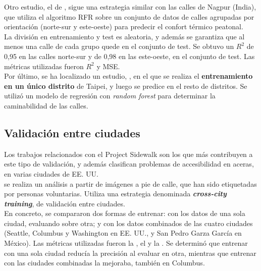 Otro estudio, el de \textcite{mohite2024}, sigue una estrategia similar con las calles de Nagpur (India), que utiliza el algoritmo \gls{RFR} sobre un conjunto de datos de calles agrupadas por orientación (norte-sur y este-oeste) para predecir el confort térmico peatonal.
\\

La división en entrenamiento y test es aleatoria, y además se garantiza que al menos una calle de cada grupo quede en el conjunto de test. Se obtuvo un $R^2$ de 0,95 en las calles norte-sur y de 0,98 en las este-oeste, en el conjunto de test. Las métricas utilizadas fueron $R^2$ y \gls{MSE}.
\\

Por último, se ha localizado un estudio, \textcite{li2024gsv}, en el que se realiza el \textbf{entrenamiento en un único distrito} de Taipei, y luego se predice en el resto de distritos. Se utilizó un modelo de regresión con \textit{random forest} para determinar la caminabilidad de las calles.
\\

\subsection{Validación entre ciudades}
\label{subsec:validacion-ciudades}

Los trabajos relacionados con el Project Sidewalk son los que más contribuyen a este tipo de validación, y además clasifican problemas de accesibilidad en aceras, en varias ciudades de EE. UU.
\\

\textcite{duan2022} se realiza un análisis a partir de imágenes a pie de calle, que han sido etiquetadas por personas voluntarias. Utiliza una estrategia denominada \textbf{\textit{cross-city training}}, de validación entre ciudades.
\\

En concreto, se compararon dos formas de entrenar: con los datos de una sola ciudad, evaluando sobre otra; y con los datos combinados de las cuatro ciudades (Seattle, Columbus y Washington en EE. UU., y San Pedro Garza García en México). Las métricas utilizadas fueron la , el  y la . Se determinó que entrenar con una sola ciudad reducía la precisión al evaluar en otra, mientras que entrenar con las ciudades combinadas la mejoraba, también en Columbus.
\\

